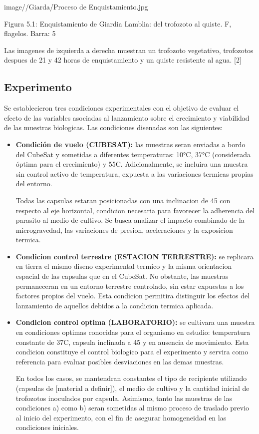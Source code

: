     image//Giarda/Proceso de Enquistamiento.jpg

    Figura 5.1: Enquistamiento de Giardia Lamblia: del trofozoto al quiste. F, flagelos. Barra: 5

    Las imagenes de izquierda a derecha muestran un trofozoto vegetativo, trofozotos despues de 21 y
    42 horas de enquistamiento y un quiste resistente al agua. [2]

  \subsection{Experimento}
    Se establecieron tres condiciones experimentales con el objetivo de evaluar el efecto de las
    variables asociadas al lanzamiento sobre el crecimiento y viabilidad de las muestras biologicas.
    Las condiciones disenadas son las siguientes:
 
    \begin{itemize}
      \item \textbf{Condición de vuelo (CUBESAT):} las muestras seran enviadas a bordo del CubeSat y
      sometidas a diferentes temperaturas: 10°C, 37°C (considerada óptima para el
      crecimiento) y 55C. Adicionalmente, se incluira una muestra sin control activo de temperatura,
      expuesta a las variaciones termicas propias del entorno.

      Todas las capsulas estaran posicionadas con una inclinacion de 45 con respecto al eje horizontal, condicion
      necesaria para favorecer la adherencia del parasito al medio de cultivo. Se busca analizar el
      impacto combinado de la microgravedad, las variaciones de presion, aceleraciones
      y la exposicion termica.

      \item \textbf{Condicion control terrestre (ESTACION TERRESTRE):} se replicara en tierra
      el mismo diseno experimental termico y la misma orientacion espacial de las capsulas
      que en el CubeSat. No obstante, las muestras permaneceran en un entorno terrestre
      controlado, sin estar expuestas a los factores propios del vuelo. Esta condicion permitira
      distinguir los efectos del lanzamiento de aquellos debidos a la condicion termica
      aplicada.

      \item \textbf{Condicion control optima (LABORATORIO):} se cultivara una muestra en condiciones optimas
      conocidas para el organismo en estudio: temperatura constante de
      37C, capsula inclinada a 45 y en ausencia de movimiento. Esta condicion constituye
      el control biologico para el experimento y servira como referencia para evaluar posibles
      desviaciones en las demas muestras.

      En todos los casos, se mantendran constantes el tipo de recipiente utilizado (capsulas de
      [material a definir]), el medio de cultivo y la cantidad inicial de trofozotos inoculados por
      capsula. Asimismo, tanto las muestras de las condiciones a) como b) seran sometidas al mismo
      proceso de traslado previo al inicio del experimento, con el fin de asegurar homogeneidad en
      las condiciones iniciales.
    \end{itemize}

